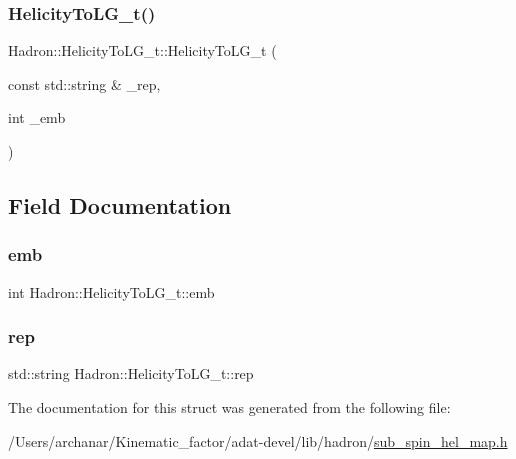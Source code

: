 \mbox{\label{structHadron_1_1HelicityToLG__t_a169aa4cb0f221e29db87c404f56eacf6}} 
\subsubsection{\texorpdfstring{HelicityToLG\_t()}{HelicityToLG\_t()}\hspace{0.1cm}{\footnotesize\ttfamily [3/3]}}
{\footnotesize\ttfamily Hadron\+::\+Helicity\+To\+L\+G\+\_\+t\+::\+Helicity\+To\+L\+G\+\_\+t (\begin{DoxyParamCaption}\item[{const std\+::string \&}]{\+\_\+rep,  }\item[{int}]{\+\_\+emb }\end{DoxyParamCaption})\hspace{0.3cm}{\ttfamily [inline]}}



\subsection{Field Documentation}
\mbox{\label{structHadron_1_1HelicityToLG__t_aa2343a2515755f6a1bc6cf802e12a183}} 
\subsubsection{\texorpdfstring{emb}{emb}}
{\footnotesize\ttfamily int Hadron\+::\+Helicity\+To\+L\+G\+\_\+t\+::emb}

\mbox{\label{structHadron_1_1HelicityToLG__t_a49a6869a62bf38d55a2cf332750bf365}} 
\subsubsection{\texorpdfstring{rep}{rep}}
{\footnotesize\ttfamily std\+::string Hadron\+::\+Helicity\+To\+L\+G\+\_\+t\+::rep}



The documentation for this struct was generated from the following file\+:\begin{DoxyCompactItemize}
\item 
/\+Users/archanar/\+Kinematic\+\_\+factor/adat-\/devel/lib/hadron/\mbox{\hyperlink{adat-devel_2lib_2hadron_2sub__spin__hel__map_8h}{sub\+\_\+spin\+\_\+hel\+\_\+map.\+h}}\end{DoxyCompactItemize}
